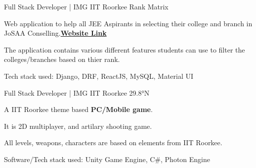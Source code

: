 
\begin{cventries}


\cventry
	{Full Stack Developer | IMG IIT Roorkee} %
	{Rank Matrix} %
	{} %
	{} %
	{
		\begin{cvitems} %
			\item {Web application to help all JEE Aspirants in selecting their college and branch in JoSAA Conselling.{\href{https://rankmatrix.iitr.ac.in}{\bf Website Link}}}
			\item{The application contains various different features students can use to filter the colleges/branches based on thier rank.}
			\item{Tech stack used: Django, DRF, ReactJS, MySQL, Material UI}
		\end{cvitems}
	}



\cventry
{Full Stack Developer | IMG IIT Roorkee} %
{29.8°N} %
{} %
{} %
{
	\begin{cvitems} %
		\item {A IIT Roorkee theme based \textbf{PC/Mobile game}.}
		\item{It is 2D multiplayer, and artilary shooting game.}
		\item{All levels, weapons, characters are based on elements from IIT Roorkee.}
		\item{Software/Tech stack used: Unity Game Engine, C\#, Photon Engine}
	\end{cvitems}
}    




\end{cventries}